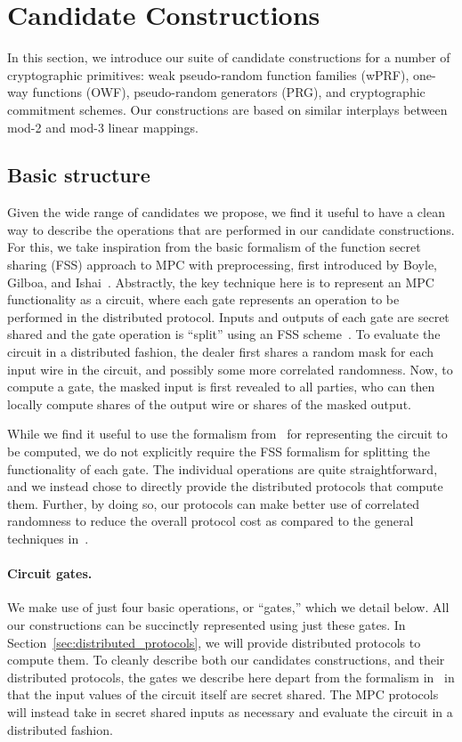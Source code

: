 
\newpage

\section{Candidate Constructions}
In this section, we introduce our suite of candidate constructions for a number of cryptographic primitives: weak pseudo-random function families (wPRF), one-way functions (OWF), pseudo-random generators (PRG), and cryptographic commitment schemes. Our constructions are based on similar interplays between mod-2 and mod-3 linear mappings. 

\subsection{Basic structure}
Given the wide range of candidates we propose, we find it useful to have a clean way to describe the operations that are performed in our candidate constructions. For this, we take inspiration from the basic formalism of the function secret sharing (FSS) approach to MPC with preprocessing, first introduced by Boyle, Gilboa, and Ishai~\cite{boyle2019-fss-preprocess}. Abstractly, the key technique here is to represent an MPC functionality as a circuit, where each gate represents an operation to be performed in the distributed protocol. Inputs and outputs of each gate are secret shared and the gate operation is ``split'' using an FSS scheme~\cite{boyle2015-fss,boyle2016-fss-extension}. To evaluate the circuit in a distributed fashion, the dealer first shares a random mask for each input wire in the circuit, and possibly some more correlated randomness. Now, to compute a gate, the masked input is first revealed to all parties, who can then locally compute shares of the output wire or shares of the masked output.

While we find it useful to use the formalism from~\cite{boyle2019-fss-preprocess} for representing the circuit to be computed, we do not explicitly require the FSS formalism for splitting the functionality of each gate. The individual operations are quite straightforward, and we instead chose to directly provide the distributed protocols that compute them. Further, by doing so, our protocols can make better use of correlated randomness to reduce the overall protocol cost as compared to the general techniques in~\cite{boyle2019-fss-preprocess}.


\paragraph{Circuit gates.}
We make use of just four basic operations, or ``gates,'' which we detail below. All our constructions can be succinctly represented using just these gates. In Section~\ref{sec:distributed_protocols}, we will provide distributed protocols to compute them. To cleanly describe both our candidates constructions, and their distributed protocols, the gates we describe here depart from the formalism in~\cite{boyle2019-fss-preprocess} in that the input values of the circuit itself are secret shared. The MPC protocols will instead take in secret shared inputs as necessary and evaluate the circuit in a distributed fashion.

